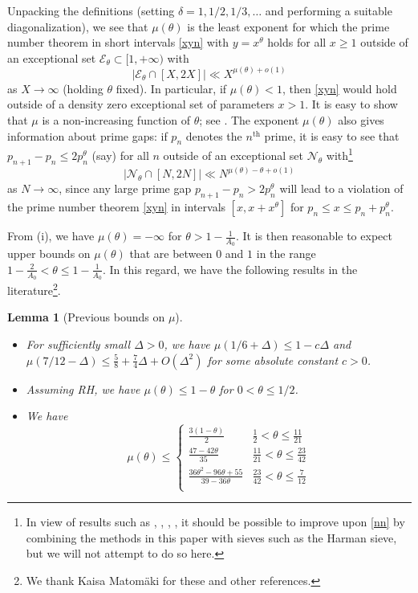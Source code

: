 \documentclass[12pt]{amsart}
\newtheorem{lemma}{Lemma}[section]
\begin{document}
Unpacking the definitions (setting $\delta = 1, 1/2, 1/3,\dots$ and performing a suitable diagonalization), we see that $\mu(\theta)$ is the least exponent for which the prime number theorem in short intervals \eqref{xyn} with $y = x^\theta$ holds for all $x \geq 1$ outside of an exceptional set ${\mathcal E}_\theta \subset [1,+\infty)$ with
$$ |{\mathcal E}_\theta \cap [X, 2X]| \ll X^{\mu(\theta)+o(1)}$$
as $X \to \infty$ (holding $\theta$ fixed). In particular, if $\mu(\theta) < 1$, then \eqref{xyn} would hold outside of a density zero exceptional set of parameters $x>1$.  It is easy to show that $\mu$ is a non-increasing function of $\theta$; see \cite[Corollary 1(i)]{bp}.  The exponent $\mu(\theta)$ also gives information about prime gaps: if $p_n$ denotes the $n^{\mathrm{th}}$ prime, it is easy to see that $p_{n+1}-p_n \leq 2 p_n^{\theta}$ (say) for all $n$ outside of an exceptional set ${\mathcal N}_\theta$ with\footnote{In view of results such as \cite{islam}, \cite{peck}, \cite{jarviniemi}, \cite{li}, it should be possible to improve upon \eqref{nn} by combining the methods in this paper with sieves such as the Harman sieve, but we will not attempt to do so here.}
\begin{equation}\label{nn}
   |{\mathcal N}_\theta \cap [N, 2N]| \ll N^{\mu(\theta)-\theta+o(1)}
\end{equation}
as $N \to \infty$, since any large prime gap $p_{n+1}-p_n > 2 p_n^{\theta}$ will lead to a violation of the prime number theorem \eqref{xyn} in intervals $[x,x+x^\theta]$ for $p_n \leq x \leq p_n + p_n^\theta$.

From (i), we have $\mu(\theta) = -\infty$ for $\theta > 1 - \frac{1}{A_0}$.  It is then reasonable to expect upper bounds on $\mu(\theta)$ that are between $0$ and $1$ in the range $1-\frac{2}{A_0} < \theta \leq 1-\frac{1}{A_0}$.  In this regard, we have the following results in the literature\footnote{We thank Kaisa Matom\"aki for these and other references.}.

\begin{lemma}[Previous bounds on $\mu$]\label{baz-bound}\
  \begin{itemize}
    \item[(i)]\cite[Theorem 2(i)]{bp} For sufficiently small $\Delta>0$, we have $\mu(1/6 + \Delta) \leq 1 - c\Delta$ and $\mu(7/12-\Delta) \leq \frac{5}{8} + \frac{7}{4}\Delta + O(\Delta^2)$ for some absolute constant $c>0$.
  \item[(ii)] \cite[Theorem 2(ii)]{bp} Assuming RH, we have $\mu(\theta) \leq 1-\theta$ for $0 < \theta \leq 1/2$.
    \item[(iii)] \cite[Lemma 1]{baz-2} We have
  $$
  \mu(\theta) \leq
  \begin{cases}
  \frac{3(1-\theta)}{2} & \frac{1}{2} < \theta \leq \frac{11}{21} \\
  \frac{47-42\theta}{35}& \frac{11}{21} < \theta \leq \frac{23}{42} \\
  \frac{36\theta^2-96\theta+55}{39-36\theta} & \frac{23}{42} < \theta \leq \frac{7}{12} \\
  \end{cases}
  $$
  \end{itemize}
\end{lemma}
\end{document}
